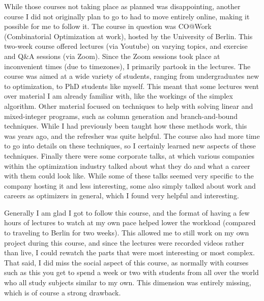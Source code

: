 \documentclass[a4paper,12pt]{article}
\begin{document}
\bigskip

While those courses not taking place as planned was disappointing, another course I did not originally plan to go to had to move entirely online, making it possible for me to follow it. The course in question was CO@Work (Combinatorial Optimization at work), hosted by the University of Berlin. This two-week course offered lectures (via Youtube) on varying topics, and exercise and Q\&A sessions (via Zoom). Since the Zoom sessions took place at inconvenient times (due to timezones), I primarily partook in the lectures. The course was aimed at a wide variety of students, ranging from undergraduates new to optimization, to PhD students like myself. This meant that some lectures went over material I am already familiar with, like the workings of the simplex algorithm. Other material focused on techniques to help with solving linear and mixed-integer programs, such as column generation and branch-and-bound techniques. While I had previously been taught how these methods work, this was years ago, and the refresher was quite helpful. The course also had more time to go into details on these techniques, so I certainly learned new aspects of these techniques. Finally there were some corporate talks, at which various companies within the optimization industry talked about what they do and what a career with them could look like. While some of these talks seemed very specific to the company hosting it and less interesting, some also simply talked about work and careers as optimizers in general, which I found very helpful and interesting. 

Generally I am glad I got to follow this course, and the format of having a few hours of lectures to watch at my own pace helped lower the workload (compared to traveling to Berlin for two weeks). This allowed me to still work on my own project during this course, and since the lectures were recorded videos rather than live, I could rewatch the parts that were most interesting or most complex. That said, I did miss the social aspect of this course, as normally with courses such as this you get to spend a week or two with students from all over the world who all study subjects similar to my own. This dimension was entirely missing, which is of course a strong drawback. 

\bigskip
\end{document}
